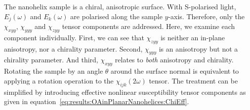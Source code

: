 The nanohelix sample is a chiral, anisotropic surface. With S-polarised light, ${E_j}(\omega)$ and ${E_k}(\omega)$ are polarised along the sample $y$-axis. Therefore, only the $\chi_{xyy}$, $\chi_{yyy}$ and $\chi_{zyy}$ tensor components are addressed. Here, we examine each component individually. 
First, we can see that $\chi_{zyy}$ is neither an in-plane anisotropy, nor a chirality parameter. Second, $\chi_{yyy}$ is an anisotropy but not a chirality parameter. And third, $\chi_{xyy}$ relates to \textit{both} anisotropy and chirality. 
Rotating the sample by an angle $\theta$ around the surface normal is equivalent to applying a rotation operation to the $\chi_{ijk}(2\omega)$ tensor. The treatment can be simplified by introducing effective nonlinear susceptibility tensor components as given in equation~\ref{eq:results:OAinPlanarNanohelices:ChiEff}.

